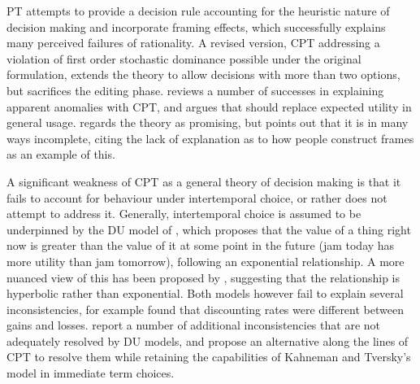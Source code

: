 \ac{PT} \citep{Kahneman1979} attempts to provide a decision rule
accounting for the heuristic nature of decision making and incorporate
framing effects, which successfully explains many perceived failures
of rationality. A revised version, \ac{CPT} \citep{Tversky1992}
addressing a violation of first order stochastic dominance possible
under the original formulation, extends the theory to allow decisions
with more than two options, but sacrifices the editing phase. \citet{Camerer2004a}
reviews a number of successes in explaining apparent anomalies with
\ac{CPT}, and argues that should replace expected utility in general
usage. \citet{Thaler2000} regards the theory as promising, but points
out that it is in many ways incomplete, citing the lack of explanation
as to how people construct frames as an example of this.

A significant weakness of \ac{CPT} as a general theory of decision
making is that it fails to account for behaviour under intertemporal
choice, or rather does not attempt to address it. Generally, intertemporal
choice is assumed to be underpinned by the \ac{DU} model of \citet{Samuelson1937},
which proposes that the value of a thing right now is greater than
the value of it at some point in the future (jam today has more utility
than jam tomorrow), following an exponential relationship. A more
nuanced view of this has been proposed by \citet{Ainslie1991}, suggesting
that the relationship is hyperbolic rather than exponential. Both
models however fail to explain several inconsistencies, for example
\citet{Thaler1981} found that discounting rates were different between
gains and losses. \citet{Loewenstein1992} report a number of additional
inconsistencies that are not adequately resolved by \ac{DU} models,
and propose an alternative along the lines of \ac{CPT} to resolve
them while retaining the capabilities of Kahneman and Tversky's model
in immediate term choices.
